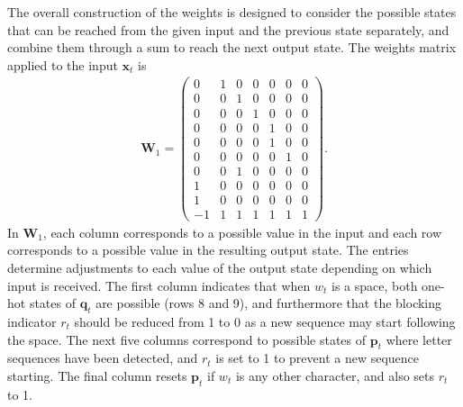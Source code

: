 \documentclass{somasmsc}
\begin{document}
The overall construction of the weights is designed to consider the possible states that can be reached from the given input and the previous state separately, and combine them through a sum to reach the next output state. The weights matrix applied to the input $\pmb{x}_t$ is
\begin{align*}
\mathbf{W}_1 =
\begin{pmatrix}
 0 & 1 & 0 & 0 & 0 & 0 & 0\\
 0 & 0 & 1 & 0 & 0 & 0 & 0\\
 0 & 0 & 0 & 1 & 0 & 0 & 0\\
 0 & 0 & 0 & 0 & 1 & 0 & 0\\
 0 & 0 & 0 & 0 & 1 & 0 & 0\\
 0 & 0 & 0 & 0 & 0 & 1 & 0\\
 0 & 0 & 1 & 0 & 0 & 0 & 0\\
 1 & 0 & 0 & 0 & 0 & 0 & 0\\
 1 & 0 & 0 & 0 & 0 & 0 & 0\\
-1 & 1 & 1 & 1 & 1 & 1 & 1
\end{pmatrix}.
\end{align*}
In $\mathbf{W}_1$, each column corresponds to a possible value in the input and each row corresponds to a possible value in the resulting output state. The entries determine adjustments to each value of the output state depending on which input is received. The first column indicates that when $w_t$ is a space, both one-hot states of $\pmb{q}_t$ are possible (rows 8 and 9), and furthermore that the blocking indicator $r_t$ should be reduced from 1 to 0 as a new sequence may start following the space. The next five columns correspond to possible states of $\pmb{p}_t$ where letter sequences have been detected, and $r_t$ is set to 1 to prevent a new sequence starting. The final column resets $\pmb{p}_t$ if $w_t$ is any other character, and also sets $r_t$ to 1.
\end{document}
